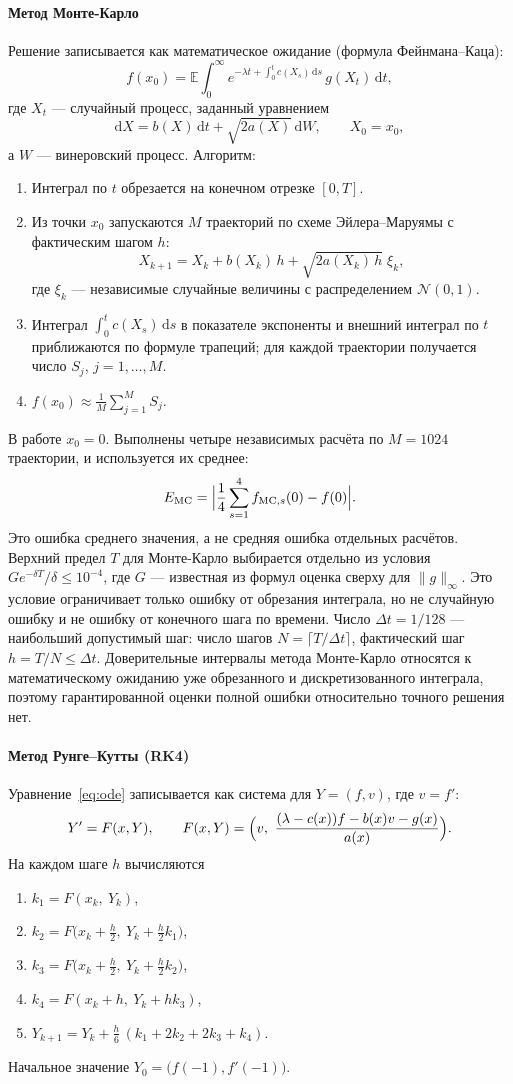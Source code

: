 \documentclass[14pt,a4paper]{extarticle}
\newcommand{\dd}{\mathrm{d}}
\begin{document}
\paragraph{Метод Монте-Карло\\}
Решение записывается как математическое ожидание (формула
Фейнмана--Каца):
\[
f(x_0)=\mathbb E\int_0^\infty
e^{-\lambda t+\int_0^t c(X_s)\,\dd s}\,g(X_t)\,\dd t,
\]
где $X_t$ --- случайный процесс, заданный уравнением
\[
\dd X=b(X)\,\dd t+\sqrt{2a(X)}\,\dd W,\qquad X_0=x_0,
\]
а $W$ --- винеровский процесс.
Алгоритм:
\begin{enumerate}
\item Интеграл по $t$ обрезается на конечном отрезке $[0,T]$.
\item Из точки $x_0$ запускаются $M$ траекторий по схеме
Эйлера--Маруямы с фактическим шагом $h$:
\[
X_{k+1}=X_k+b(X_k)\,h+\sqrt{2a(X_k)\,h}\;\xi_k,
\]
где $\xi_k$ --- независимые случайные величины с распределением
$\mathcal N(0,1)$.
\item Интеграл $\int_0^tc(X_s)\,\dd s$ в показателе экспоненты и внешний
интеграл по $t$ приближаются по формуле трапеций; для каждой траектории
получается
число $S_j$, $j=1,\dots,M$.
\item $f(x_0)\approx\frac1M\sum_{j=1}^MS_j$.
\end{enumerate}
В работе $x_0=0$. Выполнены четыре независимых расчёта
по $M=1024$ траектории, и используется их среднее:
\[
E_{\mathrm{MC}}=\Bigl|\frac14\sum_{s=1}^4 f_{\mathrm{MC},s}(0)-f(0)\Bigr|.
\]
Это ошибка среднего значения, а не средняя ошибка отдельных расчётов.
Верхний предел $T$ для Монте-Карло выбирается отдельно из условия
$G e^{-\delta T}/\delta\le10^{-4}$, где $G$ --- известная из формул
оценка сверху для $\|g\|_\infty$. Это условие ограничивает только ошибку
от обрезания интеграла, но не случайную ошибку и не ошибку от конечного
шага по времени. Число $\Delta t=1/128$ --- наибольший допустимый шаг:
число шагов $N=\lceil T/\Delta t\rceil$, фактический шаг
$h=T/N\le\Delta t$. Доверительные интервалы метода Монте-Карло
относятся к математическому ожиданию уже обрезанного
и дискретизованного интеграла, поэтому гарантированной оценки полной
ошибки относительно точного решения нет.

\paragraph{Метод Рунге--Кутты (RK4)\\}
Уравнение~\eqref{eq:ode} записывается как система для $Y=(f,v)$, где
$v=f'$:
\[
Y'=F(x,Y),\qquad
F(x,Y)=\Bigl(v,\ \frac{(\lambda-c(x))f-b(x)v-g(x)}{a(x)}\Bigr).
\]
На каждом шаге $h$ вычисляются
\begin{enumerate}
\item $k_1=F(x_k,\ Y_k)$,
\item $k_2=F\bigl(x_k+\tfrac h2,\ Y_k+\tfrac h2k_1\bigr)$,
\item $k_3=F\bigl(x_k+\tfrac h2,\ Y_k+\tfrac h2k_2\bigr)$,
\item $k_4=F(x_k+h,\ Y_k+hk_3)$,
\item $Y_{k+1}=Y_k+\tfrac h6\,(k_1+2k_2+2k_3+k_4)$.
\end{enumerate}
Начальное значение $Y_0=\bigl(f(-1),f'(-1)\bigr)$.
\end{document}
